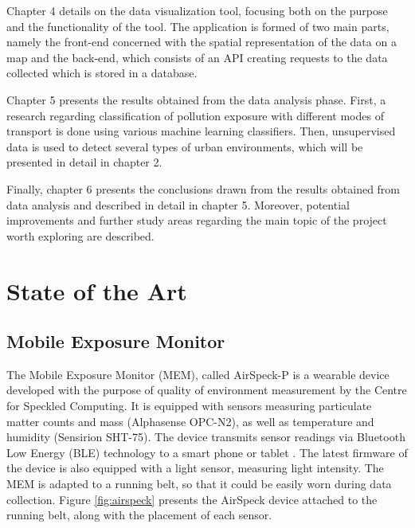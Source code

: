 \documentclass[bsc,frontabs,twoside,singlespacing,parskip,deptreport]{infthesis}     %
\begin{document}
Chapter 4 details on the data visualization tool, focusing both on the purpose and the functionality of the tool. The application is formed of two main parts, namely the front-end concerned with the spatial representation of the data on a map and the back-end, which consists of an API creating requests to the data collected which is stored in a database.

Chapter 5 presents the results obtained from the data analysis phase. First, a research regarding classification of pollution exposure with different modes of transport is done using various machine learning classifiers. Then, unsupervised data is used to detect several types of urban environments, which will be presented in detail in chapter 2.

Finally, chapter 6 presents the conclusions drawn from the results obtained from data analysis and described in detail in chapter 5. Moreover, potential improvements and further study areas regarding the main topic of the project worth exploring are described.

\chapter{State of the Art}

\section{Mobile Exposure Monitor}

The Mobile Exposure Monitor (MEM), called AirSpeck-P is a wearable device developed with the purpose of quality of environment measurement by the Centre for Speckled Computing. It is equipped with sensors measuring particulate matter counts and mass (Alphasense OPC-N2), as well as temperature and humidity (Sensirion SHT-75). The device transmits sensor readings via Bluetooth Low Energy (BLE) technology to a smart phone or tablet \cite{airspeck}. The latest firmware of the device is also equipped with a light sensor, measuring light intensity. The MEM is adapted to a running belt, so that it could be easily worn during data collection. Figure \ref{fig:airspeck} presents the AirSpeck device attached to the running belt, along with the placement of each sensor.
\end{document}
